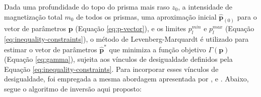 Dada uma profundidade do topo do prisma mais raso $z_{0}$, a intensidade de magnetização total $m_{0}$ de todos os prismas, uma aproximação inicial $\hat{\mathbf{p}}_{(0)}$ para o vetor de parâmetros $\mathbf{p}$ (Equação \ref{eq:p-vector}), e os limites 
$p_{l}^{min}$ e $p_{l}^{max}$ (Equação \ref{eq:inequality-constraints}), o método de Levenberg-Marquardt \cite[por exemplo, ][ p. 624]{seber_wild2003} é utilizado para estimar o vetor de parâmetros $\hat{\mathbf{p}}^{\ast}$ que minimiza a função objetivo $\Gamma (\mathbf{p})$ (Equação \ref{eq:gamma}), sujeita aos vínculos de desigualdade definidos pela Equação \ref{eq:inequality-constraints}.
Para incorporar esses vínculos de desigualdade, foi empregada a mesma abordagem apresentada por \cite{barbosa_etal1999}, \cite{oliveirajr_etal2011} e \cite{oliveirajr_barbosa2013}.
Abaixo, segue o algoritmo de inversão aqui proposto:

